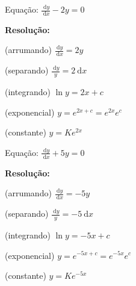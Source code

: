 \documentclass[a4paper]{article}
\newcommand{\ud}{\mathrm{\ d}}
\begin{document}
\begin{multicols}{2}

Equação: $\frac{\ud y}{\ud x} - 2y =0$

{\bf Resolução:}

(arrumando) $\frac{\ud y}{\ud x} = 2y$

(separando) $\frac{\ud y}{y} = 2\ud x$

(integrando) $\ln y = 2x +c$

(exponencial) $y = e^{2x+c}=e^{2x}e^c$

(constante) $y=Ke^{2x}$
\columnbreak

Equação: $\frac{\ud y}{\ud x}  +5y =0$

{\bf Resolução:}

(arrumando) $\frac{\ud y}{\ud x} = -5y$

(separando) $\frac{\ud y}{y} = -5\ud x$

(integrando) $\ln y = -5x +c$

(exponencial) $y = e^{-5x+c}=e^{-5x}e^c$

(constante) $y=Ke^{-5x}$

\end{multicols}
\end{document}
